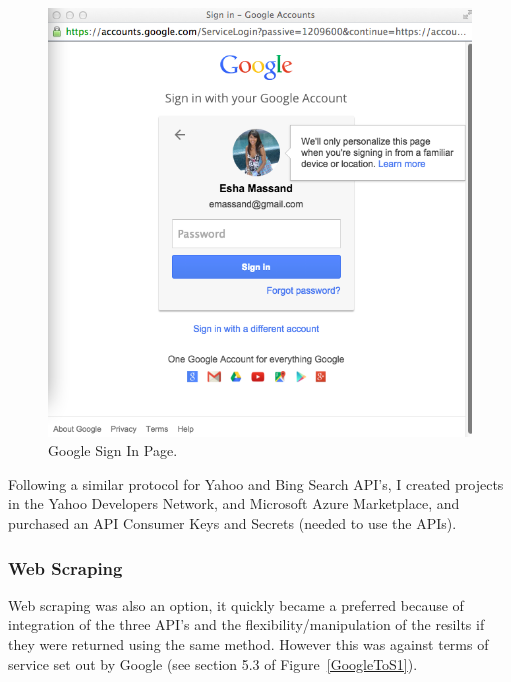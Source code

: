 \documentclass[a4paper, 11pt]{article}
\begin{document}
\begin{figure}[H]
\begin{center}
\includegraphics[scale=0.3]{GoogleSignIn}
\end{center}
\caption{Google Sign In Page.}
\label{GoogleSignInPage}

\end{figure}

Following a similar protocol for Yahoo and Bing Search API’s, I created projects in the Yahoo Developers Network, and Microsoft Azure Marketplace, and purchased an API Consumer Keys and Secrets (needed to use the APIs). 

\subsubsection{Web Scraping}
Web scraping was also an option, it quickly became a preferred because of integration of the three API’s and the flexibility/manipulation of  the resilts if they were returned using the same method. However this was against terms of service set out by Google (see section 5.3 of Figure~\ref{GoogleToS1}).
\end{document}
